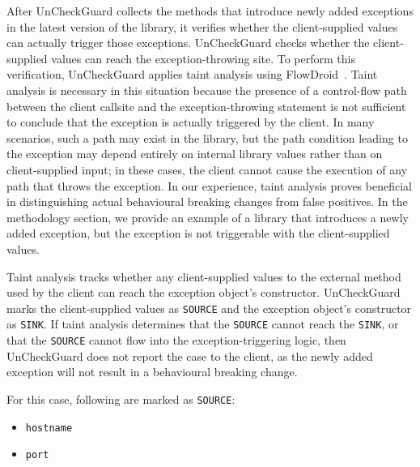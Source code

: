 After UnCheckGuard collects the methods that introduce newly added exceptions in the latest version of the library, it verifies whether the client-supplied values can actually trigger those exceptions. UnCheckGuard checks whether the client-supplied values can reach the exception-throwing site. To perform this verification, UnCheckGuard applies taint analysis using FlowDroid~\cite{Arzt14:_flowdroid}. Taint analysis is necessary in this situation because the presence of a control-flow path between the client callsite and the exception-throwing statement is not sufficient to conclude that the exception is actually triggered by the client. In many scenarios, such a path may exist in the library, but the path condition leading to the exception may depend entirely on internal library values rather than on client-supplied input; in these cases, the client cannot cause the execution of any path that throws the exception. In our experience, taint analysis proves beneficial in distinguishing actual behavioural breaking changes from false positives. In the methodology section, we provide an example of a library that introduces a newly added exception, but the exception is not triggerable with the client-supplied values.



Taint analysis tracks whether any client-supplied values to the external method used by the client can reach the exception object's constructor. UnCheckGuard marks the client-supplied values as \texttt{SOURCE} and the exception object's constructor as \texttt{SINK}. If taint analysis determines that the \texttt{SOURCE} cannot reach the \texttt{SINK}, or that the \texttt{SOURCE} cannot flow into the exception-triggering logic, then UnCheckGuard does not report the case to the client, as the newly added exception will not result in a behavioural breaking change.

For this case, following are marked as \texttt{SOURCE}:
\begin{itemize}
  \item \texttt{hostname}
  \item \texttt{port}
\end{itemize}

